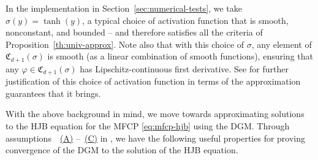 \documentclass[11pt,reqno]{amsart}
\numberwithin{equation}{section}
\theoremstyle{plain}
\begin{document}
In the implementation in Section~\ref{sec:numerical-tests}, we take $\sigma(y) = \tanh(y)$, a typical choice of activation function that is smooth, nonconstant, and bounded -- and therefore satisfies all the criteria of Proposition~\ref{th:univ-approx}. Note also that with this choice of $\sigma$, any element of $\mathfrak{C}_{d+1}(\sigma)$ is smooth (as a linear combination of smooth functions), ensuring that any $\varphi \in \mathfrak{C}_{d+1}(\sigma)$ has Lipschitz-continuous first derivative. See \cite{tanh-approx} for further justification of this choice of activation function in terms of the approximation guarantees that it brings.

With the above background in mind, we move towards approximating solutions to the HJB equation for the MFCP \eqref{eq:mfcp-hjb} using the DGM. Through assumptions~~\hyperref[a:mfcp-A]{(A)} --~\hyperref[a:mfcp-C]{(C)} in \cite{mfcp}, we have the following useful properties for proving convergence of the DGM to the solution of the HJB equation.
\end{document}
